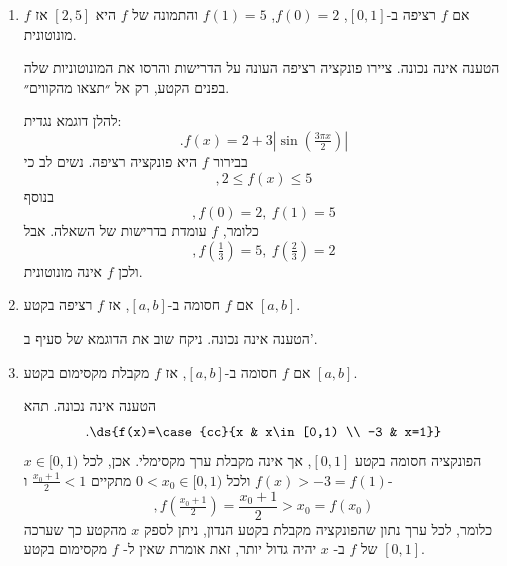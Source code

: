 \begin{enumerate}
\begin{solbox}
מכיוון ש-
$f$
מונוטונית ומתקיים
$f(0)=2<f(1)=5$,
היא מונוטונית עולה. לכן לכל
$x\in[0,1]$
מתקיים
$$,2=f(0)\leq f(x)\leq f(1)=5$$
ולכן
${\rm{Im}}(f)\subseteq[2,5]$.
מצד שני, עבור
$2=f(0)< y< f(1)=5$
קיים
$c\in[0,1]$
כך ש-
$f(c)=y$
(ממשפט ערך הביניים),
לכן
${\rm{Im}}(f)=[2,5]$.
\end{solbox}
    \item
    אם
    $f$
    רציפה ב-$[0,1]$,
    $f(0)=2$, $f(1)=5$ והתמונה של $f$ היא $[2,5]$ אז $f$ מונוטונית.
\begin{solbox}
הטענה אינה נכונה.
ציירו פונקציה רציפה העונה על הדרישות והרסו את המונוטוניות שלה בפנים הקטע, רק אל ״תצאו מהקווים״.

להלן דוגמא נגדית:
$$.f(x)=2+3|\sin(\tfrac{3\pi x}{2})|$$
בבירור
$f$
היא פונקציה רציפה.
נשים לב כי
$$,2\leq f(x)\leq 5$$
בנוסף
$$,f(0)=2,\ f(1)=5$$
כלומר,
$f$
עומדת בדרישות של השאלה. אבל
$$,f(\tfrac{1}{3})=5,\ f(\tfrac{2}{3})=2$$
ולכן
$f$
אינה מונוטונית.
\end{solbox}
    \item
    אם
    $f$
    חסומה
    ב-$[a,b]$,
    אז
    $f$
    רציפה בקטע $[a,b]$.
\begin{solbox}
הטענה אינה נכונה.
ניקח שוב את הדוגמא של סעיף ב'.
\end{solbox}
    \item
    אם
    $f$
    חסומה
    ב-$[a,b]$,
    אז
    $f$
    מקבלת מקסימום בקטע $[a,b]$.
\begin{solbox}
הטענה אינה נכונה.
תהא
$$.\ds{f(x)=\case{cc}{x & x\in[0,1) \\ -3 & x=1}}$$
הפונקציה חסומה בקטע
$[0,1]$,
אך אינה מקבלת ערך מקסימלי.
אכן,
לכל
$x\in[0,1)$
$f(x)>-3=f(1)$
ולכל
$0<x_0\in[0,1)$
מתקיים
$\frac{x_0+1}{2}<1$
ו-
$$,f(\tfrac{x_0+1}{2})=\frac{x_0+1}{2}>x_0=f(x_0)$$
כלומר, לכל ערך נתון שהפונקציה מקבלת בקטע הנדון, ניתן לספק
$x$
מהקטע כך שערכה של
$f$
ב-
$x$
יהיה גדול יותר,
זאת אומרת שאין ל-
$f$
מקסימום בקטע
$[0,1]$.
\end{solbox}
\end{enumerate}
